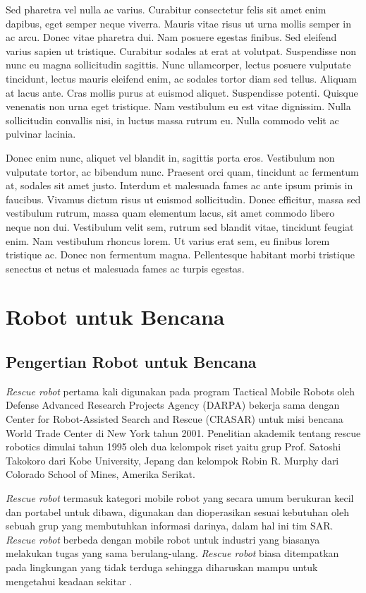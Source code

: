Sed pharetra vel nulla ac varius. Curabitur consectetur felis sit amet enim dapibus, eget semper neque viverra. Mauris vitae risus ut urna mollis semper in ac arcu. Donec vitae pharetra dui. Nam posuere egestas finibus. Sed eleifend varius sapien ut tristique. Curabitur sodales at erat at volutpat. Suspendisse non nunc eu magna sollicitudin sagittis. Nunc ullamcorper, lectus posuere vulputate tincidunt, lectus mauris eleifend enim, ac sodales tortor diam sed tellus. Aliquam at lacus ante. Cras mollis purus at euismod aliquet. Suspendisse potenti. Quisque venenatis non urna eget tristique. Nam vestibulum eu est vitae dignissim. Nulla sollicitudin convallis nisi, in luctus massa rutrum eu. Nulla commodo velit ac pulvinar lacinia.

Donec enim nunc, aliquet vel blandit in, sagittis porta eros. Vestibulum non vulputate tortor, ac bibendum nunc. Praesent orci quam, tincidunt ac fermentum at, sodales sit amet justo. Interdum et malesuada fames ac ante ipsum primis in faucibus. Vivamus dictum risus ut euismod sollicitudin. Donec efficitur, massa sed vestibulum rutrum, massa quam elementum lacus, sit amet commodo libero neque non dui. Vestibulum velit sem, rutrum sed blandit vitae, tincidunt feugiat enim. Nam vestibulum rhoncus lorem. Ut varius erat sem, eu finibus lorem tristique ac. Donec non fermentum magna. Pellentesque habitant morbi tristique senectus et netus et malesuada fames ac turpis egestas.

\section{Robot untuk Bencana}
\subsection{Pengertian Robot untuk Bencana}
\textit{Rescue robot} pertama kali digunakan pada program Tactical Mobile Robots oleh Defense Advanced Research Projects Agency (DARPA) bekerja sama dengan Center for Robot-Assisted Search and Rescue (CRASAR) untuk misi bencana World Trade Center di New York tahun 2001. Penelitian akademik tentang rescue robotics dimulai tahun 1995 oleh dua kelompok riset yaitu grup Prof. Satoshi Takokoro dari Kobe University, Jepang dan kelompok Robin R. Murphy dari Colorado School of Mines, Amerika Serikat. 

\textit{Rescue robot} termasuk kategori mobile robot yang secara umum berukuran kecil dan portabel untuk dibawa, digunakan dan dioperasikan sesuai kebutuhan oleh sebuah grup yang membutuhkan informasi darinya, dalam hal ini tim SAR. \textit{Rescue robot} berbeda dengan mobile robot untuk industri yang biasanya melakukan tugas yang sama berulang-ulang. \textit{Rescue robot} biasa ditempatkan pada  lingkungan yang tidak terduga sehingga diharuskan mampu untuk mengetahui keadaan sekitar \citet{murphy2016disaster}.


